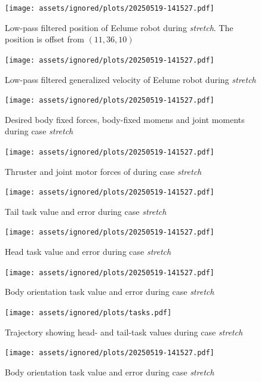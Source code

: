 \begin{figure}[!ht]
    \centering
    \texttt{[image: assets/ignored/plots/20250519-141527.pdf]}
    \caption[Low-pass filtered position of Eelume robot during \textit{stretch} case with \gls{tpc}]
    {Low-pass filtered position of Eelume robot during \textit{stretch}. The position is offset from \((11, 36, 10)\)}
    \label{fig:results:tpc:stretch:1:pos}
\end{figure}
\begin{figure}[!ht]
    \centering
    \texttt{[image: assets/ignored/plots/20250519-141527.pdf]}
    \caption{Low-pass filtered generalized velocity of Eelume robot during \textit{stretch}}
    \label{fig:results:tpc:stretch:1:vel}
\end{figure}
\begin{figure}[!ht]
    \centering
    \texttt{[image: assets/ignored/plots/20250519-141527.pdf]}
    \caption{Desired body fixed forces, body-fixed momens and joint moments during case \textit{stretch}}
    \label{fig:results:tpc:stretch:1:forces}
\end{figure}
\begin{figure}[!ht]
    \centering
    \texttt{[image: assets/ignored/plots/20250519-141527.pdf]}
    \caption{Thruster and joint motor forces of during case \textit{stretch}}
    \label{fig:results:tpc:stretch:1:forces-torques}
\end{figure}
\begin{figure}[!ht]
    \centering
    \texttt{[image: assets/ignored/plots/20250519-141527.pdf]}
    \caption{Tail task value and error during case \textit{stretch}}
    \label{fig:results:tpc:stretch:1:task:1}
\end{figure}
\begin{figure}[!ht]
    \centering
    \texttt{[image: assets/ignored/plots/20250519-141527.pdf]}
    \caption{Head task value and error during case \textit{stretch}}
    \label{fig:results:tpc:stretch:1:task:2}
\end{figure}
\begin{figure}[!ht]
    \centering
    \texttt{[image: assets/ignored/plots/20250519-141527.pdf]}
    \caption{Body orientation task value and error during case \textit{stretch}}
    \label{fig:results:tpc:stretch:1:task:3}
\end{figure}
\begin{figure}[!ht]
    \centering
    \texttt{[image: assets/ignored/plots/tasks.pdf]}
    \caption{Trajectory showing head- and tail-task values during case \textit{stretch}}
    \label{fig:results:tpc:stretch:task-traj}
\end{figure}
\begin{figure}[!ht]
    \centering
    \texttt{[image: assets/ignored/plots/20250519-141527.pdf]}
    \caption{Body orientation task value and error during case \textit{stretch}}
    \label{fig:results:tpc:stretch:dp-tracking}
\end{figure}

